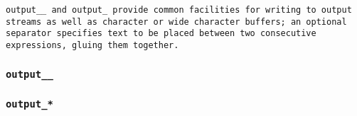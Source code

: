 \tt{output__} and \tt{output_} provide common facilities for writing
to output streams as well as character or wide character buffers;
an optional separator specifies text to be placed between
two consecutive expressions, gluing them together.

\subsubsection{\tt{output__}}


\subsubsection{\tt{output_}*}

